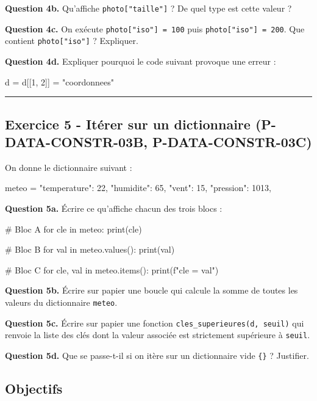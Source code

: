 \textbf{Question 4b.} Qu'affiche \texttt{photo{[}"taille"{]}} ? De quel
type est cette valeur ?

\textbf{Question 4c.} On exécute \texttt{photo{[}"iso"{]}\ =\ 100} puis
\texttt{photo{[}"iso"{]}\ =\ 200}. Que contient
\texttt{photo{[}"iso"{]}} ? Expliquer.

\textbf{Question 4d.} Expliquer pourquoi le code suivant provoque une
erreur :

\begin{python}
d = {}
d[[1, 2]] = "coordonnees"
\end{python}

\begin{center}\rule{0.5\linewidth}{0.5pt}\end{center}

\subsection{Exercice 5 - Itérer sur un dictionnaire (P-DATA-CONSTR-03B, P-DATA-CONSTR-03C)}

On donne le dictionnaire suivant :

\begin{python}
meteo = {
    "temperature": 22,
    "humidite": 65,
    "vent": 15,
    "pression": 1013,
}
\end{python}

\textbf{Question 5a.} Écrire ce qu'affiche chacun des trois blocs :

\begin{python}
# Bloc A
for cle in meteo:
    print(cle)

# Bloc B
for val in meteo.values():
    print(val)

# Bloc C
for cle, val in meteo.items():
    print(f"{cle} = {val}")
\end{python}

\textbf{Question 5b.} Écrire sur papier une boucle qui calcule la somme
de toutes les valeurs du dictionnaire \texttt{meteo}.

\textbf{Question 5c.} Écrire sur papier une fonction
\texttt{cles\_superieures(d,\ seuil)} qui renvoie la liste des clés dont
la valeur associée est strictement supérieure à \texttt{seuil}.

\textbf{Question 5d.} Que se passe-t-il si on itère sur un dictionnaire
vide \texttt{\{\}} ? Justifier.

\subsection{Objectifs}

